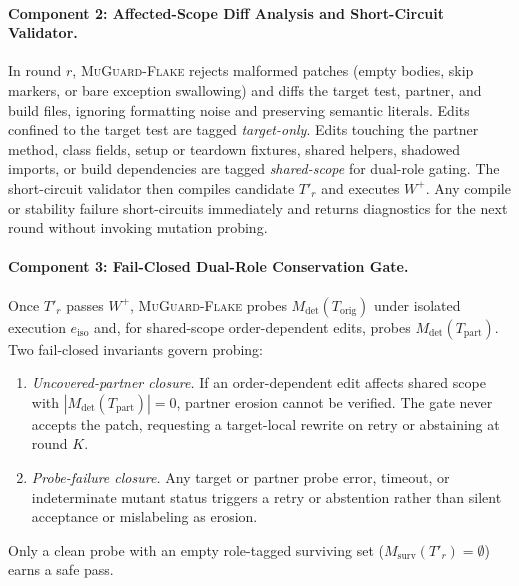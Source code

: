 \paragraph{Component 2: Affected-Scope Diff Analysis and Short-Circuit Validator.}
In round $r$, \textsc{MuGuard-Flake} rejects malformed patches (empty bodies, skip markers, or bare exception swallowing) and diffs the target test, partner, and build files, ignoring formatting noise and preserving semantic literals. Edits confined to the target test are tagged \emph{target-only}. Edits touching the partner method, class fields, setup or teardown fixtures, shared helpers, shadowed imports, or build dependencies are tagged \emph{shared-scope} for dual-role gating. The short-circuit validator then compiles candidate $T'_r$ and executes $W^+$. Any compile or stability failure short-circuits immediately and returns diagnostics for the next round without invoking mutation probing.

\paragraph{Component 3: Fail-Closed Dual-Role Conservation Gate.}
Once $T'_r$ passes $W^+$, \textsc{MuGuard-Flake} probes $M_{\text{det}}(T_{\text{orig}})$ under isolated execution $e_{\text{iso}}$ and, for shared-scope order-dependent edits, probes $M_{\text{det}}(T_{\text{part}})$. Two fail-closed invariants govern probing:
\begin{enumerate}[nosep]
    \item \emph{Uncovered-partner closure.} If an order-dependent edit affects shared scope with $|M_{\text{det}}(T_{\text{part}})| = 0$, partner erosion cannot be verified. The gate never accepts the patch, requesting a target-local rewrite on retry or abstaining at round $K$.
    \item \emph{Probe-failure closure.} Any target or partner probe error, timeout, or indeterminate mutant status triggers a retry or abstention rather than silent acceptance or mislabeling as erosion.
\end{enumerate}
Only a clean probe with an empty role-tagged surviving set ($M_{\text{surv}}(T'_r) = \emptyset$) earns a safe pass.

